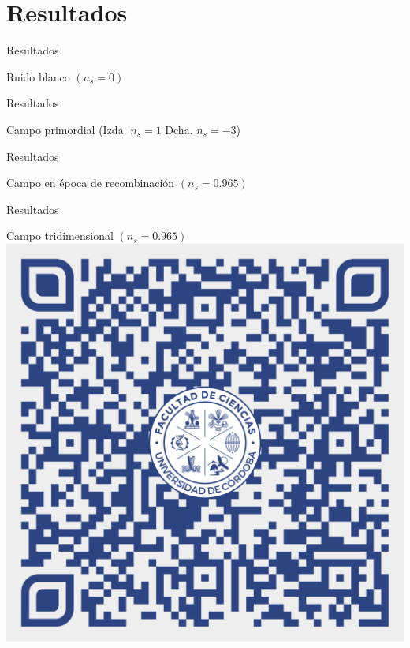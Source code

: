 \section{Resultados}
\begin{frame}[noframenumbering]{Resultados}
    \begin{block}{Ruido blanco \((n_s=0)\)}
        \centering
        \scalebox{.62}{}
    \end{block}
\end{frame}
\begin{frame}{Resultados}
    \begin{block}{Campo primordial (Izda. \(n_s=1\) Dcha. \(n_s=-3\))}
        \centering
        \scalebox{.62}{}
        \hspace{1cm}
        \scalebox{.62}{}
    \end{block}
\end{frame}
\begin{frame}{Resultados}
    \begin{block}{Campo en época de recombinación \((n_s=0.965)\)}
        \centering
        \scalebox{.62}{}
    \end{block}
\end{frame}
\begin{frame}{Resultados}
    \begin{block}{Campo tridimensional \((n_s=0.965)\)}
        \centering
        \href{https://rafaariza.github.io/rafaariza/assets/images/FS2029FSC.gif}{\includegraphics[scale=.08]{../svg/qrgifslides.pdf}}
    \end{block}
\end{frame}
